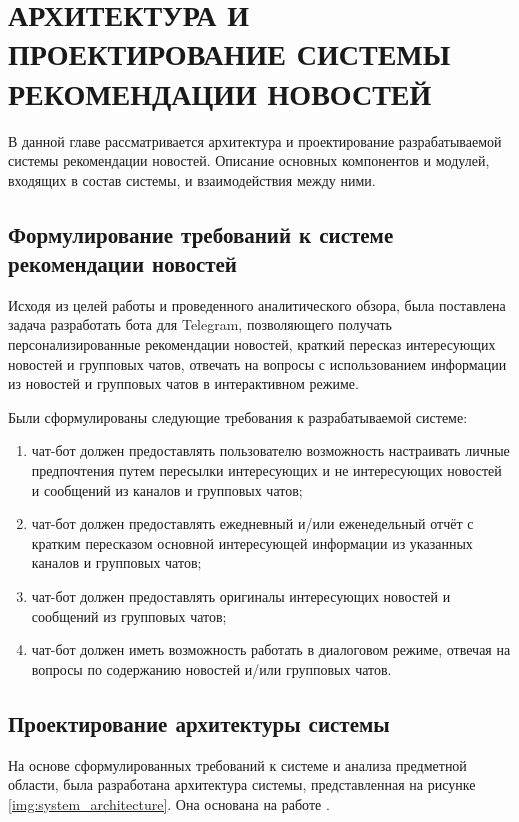 \chapter{АРХИТЕКТУРА И ПРОЕКТИРОВАНИЕ СИСТЕМЫ РЕКОМЕНДАЦИИ НОВОСТЕЙ}

В данной главе рассматривается архитектура и проектирование разрабатываемой системы рекомендации новостей. Описание основных компонентов и модулей, входящих в состав системы, и взаимодействия между ними.

\section{Формулирование требований к системе рекомендации новостей}
Исходя из целей работы и проведенного аналитического обзора, была поставлена задача разработать бота для Telegram, позволяющего получать персонализированные рекомендации новостей, краткий пересказ интересующих новостей и групповых чатов, отвечать на вопросы с использованием информации из новостей и групповых чатов в интерактивном режиме.

Были сформулированы следующие требования к разрабатываемой системе:
\begin{enumerate}
    \item чат-бот должен предоставлять пользователю возможность настраивать личные предпочтения путем пересылки интересующих и не интересующих новостей и сообщений из каналов и групповых чатов;
    \item чат-бот должен предоставлять ежедневный и/или еженедельный отчёт с кратким пересказом основной интересующей информации из указанных каналов и групповых чатов;
    \item чат-бот должен предоставлять оригиналы интересующих новостей и сообщений из групповых чатов;
    \item чат-бот должен иметь возможность работать в диалоговом режиме, отвечая на вопросы по содержанию новостей и/или групповых чатов.
\end{enumerate}

\section{Проектирование архитектуры системы}

На основе сформулированных требований к системе и анализа предметной области, была разработана архитектура системы, представленная на рисунке \ref{img:system_architecture}. Она основана на работе \cite{news_rec_gen}.

